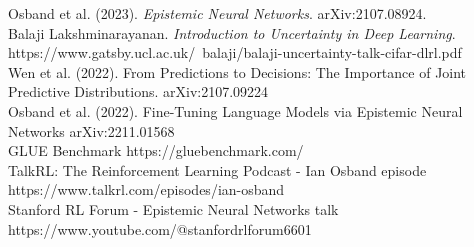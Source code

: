\documentclass[preview]{standalone}
\begin{document}
Osband et al. (2023). \textit{Epistemic Neural Networks}. arXiv:2107.08924.\\Balaji Lakshminarayanan. \textit{Introduction to Uncertainty in Deep Learning}. https://www.gatsby.ucl.ac.uk/~balaji/balaji-uncertainty-talk-cifar-dlrl.pdf\\Wen et al. (2022). From Predictions to Decisions: The Importance of Joint Predictive Distributions. arXiv:2107.09224\\Osband et al. (2022). Fine-Tuning Language Models via Epistemic Neural Networks arXiv:2211.01568\\GLUE Benchmark https://gluebenchmark.com/\\TalkRL: The Reinforcement Learning Podcast - Ian Osband episode https://www.talkrl.com/episodes/ian-osband\\Stanford RL Forum - Epistemic Neural Networks talk https://www.youtube.com/@stanfordrlforum6601\\
\end{document}
